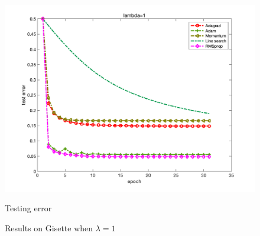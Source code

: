 \documentclass{article}
\begin{document}
\begin{figure}[H]
\begin{minipage}{0.33\linewidth}
	\includegraphics[width=1\linewidth]{./fig/err_g2}
	\caption{Testing error}
\end{minipage}
\caption*{Results on Gisette when $\lambda=1$}
\end{figure}
\end{document}
